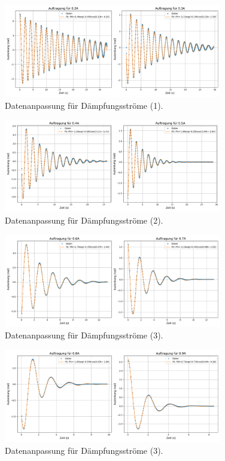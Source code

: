 \documentclass{article}
\begin{document}
\begin{figure}[H]
    \centering
    \includegraphics[width=0.85\textwidth]{Figure_1.png}
    \caption{Datenanpassung für Dämpfungsströme (1).}
    \label{fig:1}
\end{figure}
\begin{figure}[H]
    \centering
    \includegraphics[width=0.85\textwidth]{Figure_2.png}
    \caption{Datenanpassung für Dämpfungsströme (2).}
    \label{fig:2}
\end{figure}
\begin{figure}[H]
    \centering
    \includegraphics[width=0.85\textwidth]{Figure_3.png}
    \caption{Datenanpassung für Dämpfungsströme (3).}
    \label{fig:3}
\end{figure}
\begin{figure}[H]
    \centering
    \includegraphics[width=0.85\textwidth]{Figure_4.png}
    \caption{Datenanpassung für Dämpfungsströme (3).}
    \label{fig:4}
\end{figure}
\end{document}
